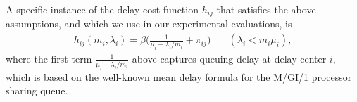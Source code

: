 A specific instance of the delay cost function $h_{ij}$ that satisfies
the above assumptions, and which we use in our experimental
evaluations, is
\begin{eqnarray}
  \label{eq:delaycost}
  h_{ij}(m_i, \lambda_{i}) = \beta \bigg (\frac{1}{\mu_i - \lambda_i/m_i} + \pi_{ij}  \bigg ) & \quad (\lambda_i < m_i\mu_i),
\end{eqnarray}
where the first term $\frac{1}{\mu_i - \lambda_i/m_i}$ above
captures queuing delay at delay center $i,$ which is based on the
well-known mean delay formula for the M/GI/1 processor sharing
queue.











